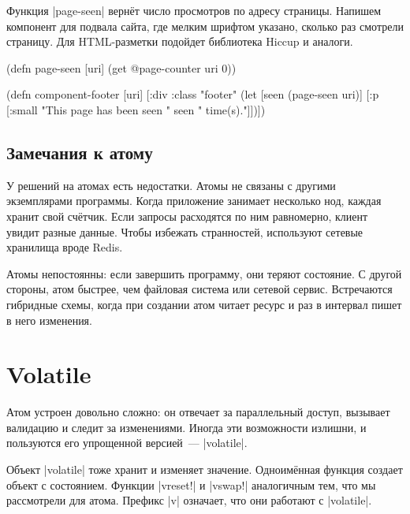 
Функция \spverb|page-seen| верн\"{е}т число просмотров по адресу страницы. Напишем
компонент для подвала сайта, где мелким шрифтом указано, сколько раз смотрели
страницу. Для HTML-разметки подойдет библиотека
Hiccup и аналоги.

\begin{english}
  \begin{clojure}
(defn page-seen [uri]
  (get @page-counter uri 0))

(defn component-footer [uri]
  [:div {:class "footer"}
   (let [seen (page-seen uri)]
     [:p [:small "This page has been seen " seen " time(s)."]])])
  \end{clojure}
\end{english}

\subsection{Замечания к атому}

У решений на атомах есть недостатки. Атомы не связаны с другими экземплярами
программы. Когда приложение занимает несколько нод, каждая хранит свой
сч\"{е}тчик. Если запросы расходятся по ним равномерно, клиент увидит разные
данные. Чтобы избежать странностей, используют сетевые хранилища вроде Redis.


Атомы непостоянны: если завершить программу, они теряют состояние. С другой
стороны, атом быстрее, чем файловая система или сетевой сервис. Встречаются
гибридные схемы, когда при создании атом читает ресурс и раз в интервал пишет в
него изменения.

\section{Volatile}


Атом устроен довольно сложно: он отвечает за параллельный доступ, вызывает
валидацию и следит за изменениями. Иногда эти возможности излишни, и пользуются
его упрощенной версией~--- \spverb|volatile|.


Объект \spverb|volatile| тоже хранит и изменяет значение. Одноим\"{е}нная функция
создает объект с состоянием. Функции \spverb|vreset!| и \spverb|vswap!|
аналогичным тем, что мы рассмотрели для атома. Префикс \spverb|v| означает, что
они работают с \spverb|volatile|.

